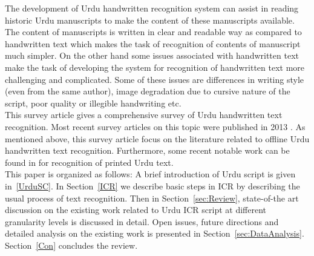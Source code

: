 The development of Urdu handwritten recognition system can assist in reading historic Urdu manuscripts to make the content of these manuscripts available. The content of manuscripts is written in clear and readable way as compared to handwritten text which makes the task of recognition of contents of manuscript much simpler. On the other hand some issues associated with handwritten text make the task of developing the system for recognition of handwritten text more challenging and complicated. Some of these issues are differences in writing style (even from the same author), image degradation due to cursive nature of the script, poor quality or illegible handwriting etc.\\
This survey article gives a comprehensive survey of Urdu handwritten text recognition. Most recent survey articles on this topic were published in 2013 \cite{7, 66, 71}. As mentioned above, this survey article focus on the literature related to offline Urdu handwritten text recognition. Furthermore, some recent notable work can be found in \cite{67, 68, 69, 70} for recognition of printed Urdu text.\\
This paper is organized as follows: A brief introduction of Urdu script is given in~\ref{UrduSC}. In Section~\ref{ICR} we describe basic steps in ICR by describing the usual process of text recognition. Then in Section~\ref{sec:Review}, state-of-the art discussion on the existing work related to Urdu ICR script at different granularity levels is discussed in detail. Open issues, future directions and detailed analysis on the existing work is presented in Section~\ref{sec:DataAnalysis}. Section~\ref{Con} concludes the review.
